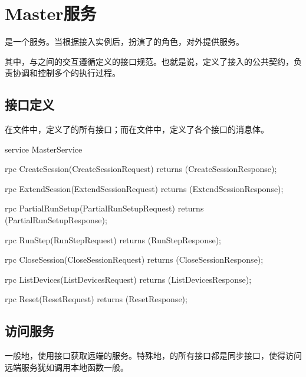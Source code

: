 \section{Master服务}

\begin{content}

是一个服务。当根据接入实例后，扮演了的角色，对外提供服务。

其中，与之间的交互遵循定义的接口规范。也就是说，定义了接入的公共契约，负责协调和控制多个的执行过程。

\subsection{接口定义}

在文件中，定义了的所有接口；而在文件中，定义了各个接口的消息体。

\begin{leftbar}
\begin{c++}
service MasterService {
  rpc CreateSession(CreateSessionRequest) 
      returns (CreateSessionResponse);
  
  rpc ExtendSession(ExtendSessionRequest) 
      returns (ExtendSessionResponse);

  rpc PartialRunSetup(PartialRunSetupRequest) 
      returns (PartialRunSetupResponse);

  rpc RunStep(RunStepRequest) 
      returns (RunStepResponse);
  
  rpc CloseSession(CloseSessionRequest) 
      returns (CloseSessionResponse);
  
  rpc ListDevices(ListDevicesRequest) 
      returns (ListDevicesResponse);

  rpc Reset(ResetRequest) 
      returns (ResetResponse);
}
\end{c++}
\end{leftbar}

\subsection{访问服务}

一般地，使用接口获取远端的服务。特殊地，的所有接口都是同步接口，使得访问远端服务犹如调用本地函数一般。


\end{content}
